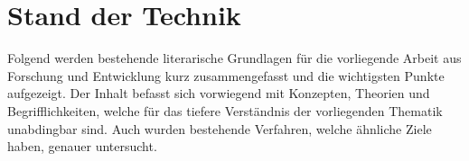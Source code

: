\chapter{Stand der Technik} \label{literatur}

Folgend werden bestehende literarische Grundlagen für die vorliegende Arbeit aus Forschung und Entwicklung kurz zusammengefasst und die wichtigsten Punkte aufgezeigt. Der Inhalt befasst sich vorwiegend mit Konzepten, Theorien und Begrifflichkeiten, welche für das tiefere Verständnis der vorliegenden Thematik unabdingbar sind. Auch wurden bestehende Verfahren, welche ähnliche Ziele haben, genauer untersucht.



